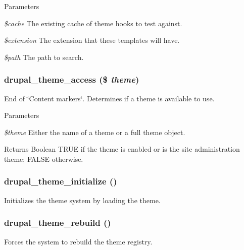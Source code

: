\begin{DoxyParams}{Parameters}
\item[{\em \$cache}]The existing cache of theme hooks to test against. \item[{\em \$extension}]The extension that these templates will have. \item[{\em \$path}]The path to search. \end{DoxyParams}
\hypertarget{includes_2theme_8inc_a8585432498ca31ecec1292096a0dce3e}{
\subsubsection[{drupal\_\-theme\_\-access}]{\setlength{\rightskip}{0pt plus 5cm}drupal\_\-theme\_\-access (\$ {\em theme})}}
\label{includes_2theme_8inc_a8585432498ca31ecec1292096a0dce3e}
End of \char`\"{}Content markers\char`\"{}. Determines if a theme is available to use.


\begin{DoxyParams}{Parameters}
\item[{\em \$theme}]Either the name of a theme or a full theme object.\end{DoxyParams}
\begin{DoxyReturn}{Returns}
Boolean TRUE if the theme is enabled or is the site administration theme; FALSE otherwise. 
\end{DoxyReturn}
\hypertarget{includes_2theme_8inc_a9e48961b3be3ca78f434b047fbb8463f}{
\subsubsection[{drupal\_\-theme\_\-initialize}]{\setlength{\rightskip}{0pt plus 5cm}drupal\_\-theme\_\-initialize ()}}
\label{includes_2theme_8inc_a9e48961b3be3ca78f434b047fbb8463f}
Initializes the theme system by loading the theme. \hypertarget{includes_2theme_8inc_a39fec3ccb5c90369be7b5df7961d47ed}{
\subsubsection[{drupal\_\-theme\_\-rebuild}]{\setlength{\rightskip}{0pt plus 5cm}drupal\_\-theme\_\-rebuild ()}}
\label{includes_2theme_8inc_a39fec3ccb5c90369be7b5df7961d47ed}
Forces the system to rebuild the theme registry.

